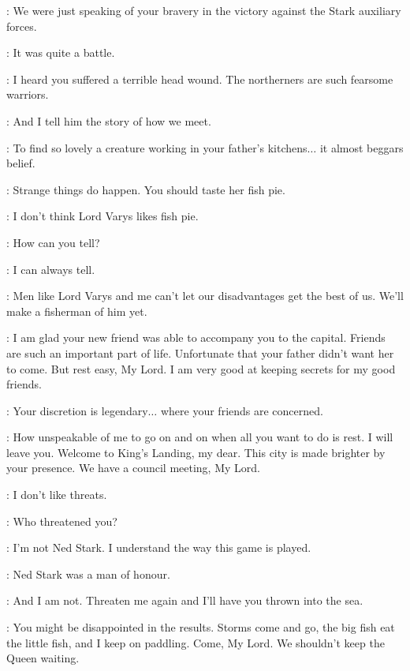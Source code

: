 \VARYS: We were just speaking of your bravery in the victory against the Stark auxiliary forces.

\TYRION: It was quite a battle.

\VARYS: I heard you suffered a terrible head wound. The northerners are such fearsome warriors.

\SHAE: And I tell him the story of how we meet.

\VARYS: To find so lovely a creature working in your father's kitchens$\ldots$ it almost beggars belief.

\TYRION: Strange things do happen. You should taste her fish pie.

\SHAE: I don't think Lord Varys likes fish pie.

\TYRION: How can you tell?

\SHAE: I can always tell.

\TYRION: Men like Lord Varys and me can't let our disadvantages get the best of us. We'll make a fisherman of him yet.

\VARYS: I am glad your new friend was able to accompany you to the capital. Friends are such an important part of life. Unfortunate that your father didn't want her to come. But rest easy, My Lord. I am very good at keeping secrets for my good friends.

\TYRION: Your discretion is legendary$\ldots$ where your friends are concerned.

\VARYS: How unspeakable of me to go on and on when all you want to do is rest. I will leave you. Welcome to King's Landing, my dear. This city is made brighter by your presence. We have a council meeting, My Lord.


\TYRION: I don't like threats.

\VARYS: Who threatened you?

\TYRION: I'm not Ned Stark. I understand the way this game is played.

\VARYS: Ned Stark was a man of honour.

\TYRION: And I am not. Threaten me again and I'll have you thrown into the sea.

\VARYS: You might be disappointed in the results. Storms come and go, the big fish eat the little fish, and I keep on paddling. Come, My Lord. We shouldn't keep the Queen waiting.



